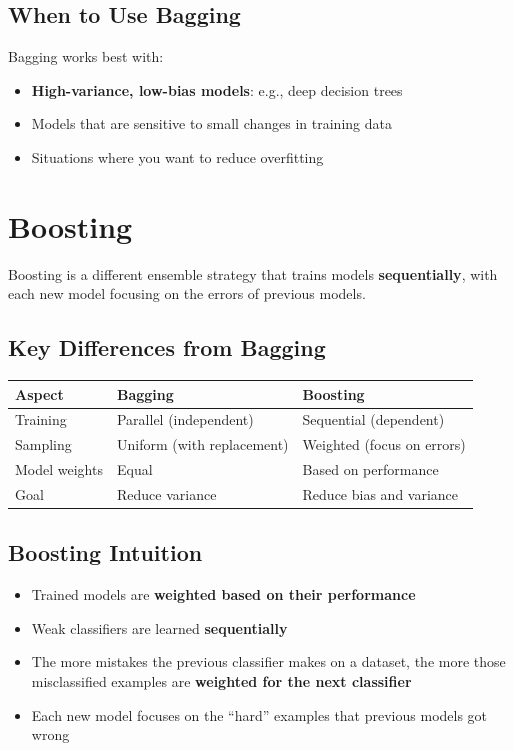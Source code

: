 \documentclass[11pt,a4paper]{article}
\theoremstyle{definition}
\theoremstyle{plain}
\theoremstyle{remark}
\begin{document}
\subsection{When to Use Bagging}

Bagging works best with:
\begin{itemize}
    \item \textbf{High-variance, low-bias models}: e.g., deep decision trees
    \item Models that are sensitive to small changes in training data
    \item Situations where you want to reduce overfitting
\end{itemize}

\section{Boosting}

Boosting is a different ensemble strategy that trains models \textbf{sequentially}, with each new model focusing on the errors of previous models.

\subsection{Key Differences from Bagging}

\begin{center}
\begin{tabular}{|l|l|l|}
\hline
\textbf{Aspect} & \textbf{Bagging} & \textbf{Boosting} \\
\hline
Training & Parallel (independent) & Sequential (dependent) \\
\hline
Sampling & Uniform (with replacement) & Weighted (focus on errors) \\
\hline
Model weights & Equal & Based on performance \\
\hline
Goal & Reduce variance & Reduce bias and variance \\
\hline
\end{tabular}
\end{center}

\subsection{Boosting Intuition}

\begin{itemize}
    \item Trained models are \textbf{weighted based on their performance}
    
    \item Weak classifiers are learned \textbf{sequentially}
    
    \item The more mistakes the previous classifier makes on a dataset, the more those misclassified examples are \textbf{weighted for the next classifier}
    
    \item Each new model focuses on the ``hard'' examples that previous models got wrong
\end{itemize}
\end{document}
